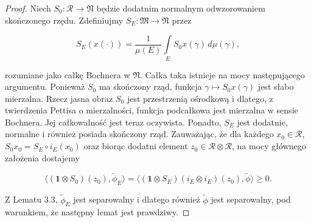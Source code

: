 \begin{proof}
Niech $S_{0}: \mathcal{R} \rightarrow \mathfrak{N}$ będzie dodatnim normalnym
odwzorowaniem skończonego rzędu.
Zdefiniujmy
$S_{E}: \mathfrak{M} \rightarrow \mathfrak{N}$ przez
\begin{linenomath*}
 \begin{equation}
S_{E}(x(\cdot)) = \frac{1}{\mu(E)}
\int \limits_{E} S_{0}x(\gamma) \, d\mu(\gamma),
 \end{equation}
\end{linenomath*}
rozumiane jako całkę Bochnera w $\mathfrak{N}$.
Całka taka istnieje na mocy następującego argumentu.
Ponieważ $S_{0}$ ma skończony rząd, funkcja
$\gamma \mapsto S_{0}x(\gamma)$ jest słabo mierzalna.
Rzecz jasna obraz $S_{0}$ jest przestrzenią ośrodkową i dlatego,
z twierdzenia Pettisa o mierzalności,
funkcja podcałkowa jest mierzalna w sensie Bochnera.
Jej całkowalność jest teraz oczywista.
Ponadto, $S_{E}$ jest dodatnie, normalne i również posiada skończony rząd.
Zauważając, że dla każdego $x_{0} \in \mathcal{R}$,
$S_{0}x_{0} = S_{E} \circ i_{E} (x_{0})$ oraz
biorąc dodatni element $z_{0} \in \mathcal{R} \otimes \mathcal{R}$,
na mocy głównego założenia dostajemy
\begin{linenomath*}
 \begin{equation}
\langle (\mathbf{1} \otimes S_{0})(z_{0}) , \tilde{\phi}_{E} \rangle =
\langle (\mathbf{1} \otimes S_{E})(i_{E} \otimes i_{E})(z_{0}),
\tilde{\phi} \rangle \geq 0.
 \end{equation}
\end{linenomath*}
Z Lematu 3.3, $\tilde{\phi}_{E}$ jest separowalny i dlatego również
$\tilde{\phi}$ jest separowalny,
pod warunkiem, że następny lemat jest prawdziwy.
\end{proof}

